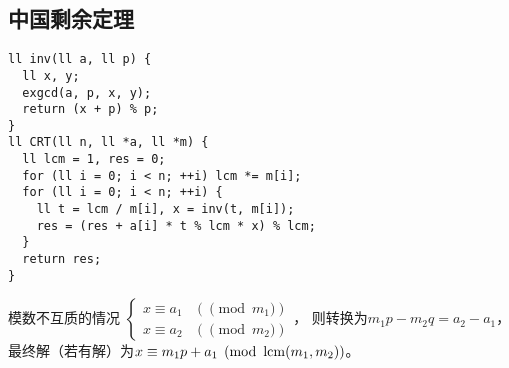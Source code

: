 \subsection{中国剩余定理}
\begin{lstlisting}
ll inv(ll a, ll p) {
  ll x, y;
  exgcd(a, p, x, y);
  return (x + p) % p;
}
ll CRT(ll n, ll *a, ll *m) {
  ll lcm = 1, res = 0;
  for (ll i = 0; i < n; ++i) lcm *= m[i];
  for (ll i = 0; i < n; ++i) {
    ll t = lcm / m[i], x = inv(t, m[i]);
    res = (res + a[i] * t % lcm * x) % lcm;
  }
  return res;
}
\end{lstlisting}

模数不互质的情况
$
  \begin{cases}
    x \equiv a_{1} &(\pmod m_{1}) \\
    x \equiv a_{2} &(\pmod m_{2})
  \end{cases}
$，
则转换为$m_{1}p - m_{2}q = a_{2} - a_{1}$，
最终解（若有解）为$x \equiv m_{1}p + a_{1} \pmod{\operatorname{lcm}(m_{1}, m_{2})}$。